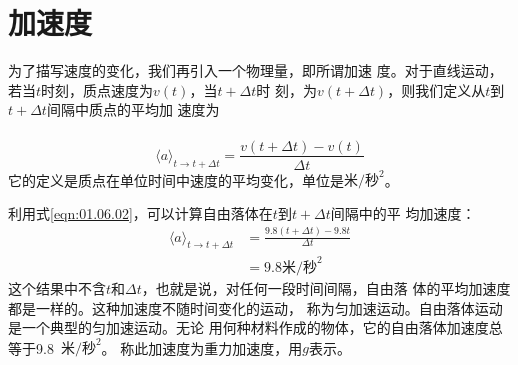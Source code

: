 \section{加速度}\label{sec:01.08}

为了描写速度的变化，我们再引入一个物理量，即所谓加速
度。对于直线运动，若当$t$时刻，质点速度为$v\left(t\right)$，当$t+\Delta t$时
刻，为$v\left(t+\Delta t\right)$，则我们定义从$t$到$t+\Delta t$间隔中质点的平均加
速度为\\~\vspace{-2em}
\begin{equation}\label{eqn:01.08.01}
  \langle a\rangle_{t\rightarrow t+\Delta t} = \frac{v\left(t+\Delta t\right)-v\left(t\right)}{\Delta t}
\end{equation}
它的定义是质点在单位时间中速度的平均变化，单位是$\text{米/秒}^2$。

利用式\eqref{eqn:01.06.02}，可以计算自由落体在$t$到$t+\Delta t$间隔中的平
均加速度：\vspace{-1em}
\begin{equation*}
  \begin{aligned}
    \langle a\rangle_{t\rightarrow t+\Delta t} & = \frac{9.8\left(t+\Delta t\right)-9.8t}{\Delta t} \\
                                               & = 9.8\text{米/秒}^2
  \end{aligned}
\end{equation*}
这个结果中不含$t$和$\Delta t$，也就是说，对任何一段时间间隔，自由落
体的平均加速度都是一样的。这种加速度不随时间变化的运动，
称为匀加速运动。自由落体运动是一个典型的匀加速运动。无论
用何种材料作成的物体，它的自由落体加速度总等于9.8~$\text{米/秒}^2$。
称此加速度为重力加速度，用$g$表示。

